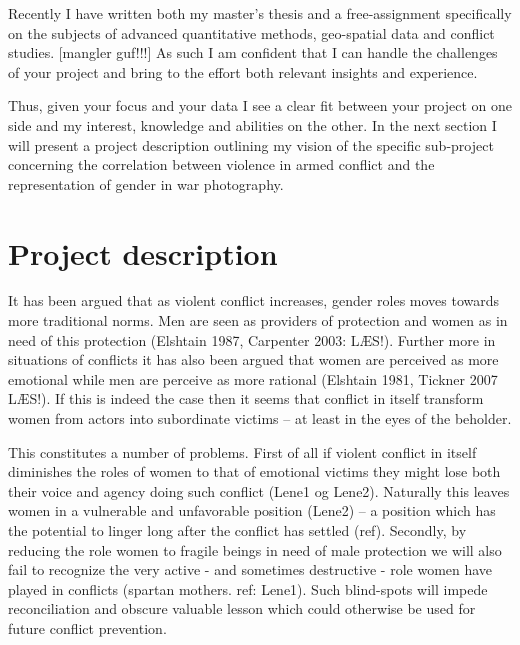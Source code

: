 \documentclass[a4paper]{article}
\begin{document}
Recently I have written both my master's thesis \citep{SPECIALE} and a free-assignment \citep{Maase} specifically on the subjects of advanced quantitative methods, geo-spatial data and conflict studies. [mangler guf!!!] As such I am confident that I can handle the challenges of your project and bring to the effort both relevant insights and experience.\par%

Thus, given your focus and your data I see a clear fit between your project on one side and my interest, knowledge and abilities on the other. In the next section I will present a project description outlining my vision of the specific sub-project concerning the correlation between violence in armed conflict and the representation of gender in war photography.\par

\section{Project description} 



It has been argued that as violent conflict increases, gender roles moves towards more traditional norms. Men are seen as providers of protection and women as in need of this protection (Elshtain 1987, Carpenter 2003: LÆS!). Further more in situations of conflicts it has also been argued that women are perceived as more emotional while men are perceive as more rational (Elshtain 1981, Tickner 2007 LÆS!). If this is indeed the case then it seems that conflict in itself transform women from actors into subordinate victims -- at least in the eyes of the beholder.\par 

This constitutes a number of problems. First of all if violent conflict in itself diminishes the roles of women to that of emotional victims they might lose both their voice and agency doing such conflict (Lene1 og Lene2). Naturally this leaves women in a vulnerable and unfavorable position (Lene2) -- a position which has the potential to linger long after the conflict has settled (ref). Secondly, by reducing the role women to fragile beings in need of male protection we will also fail to recognize the very active - and sometimes destructive - role women have played in conflicts (spartan mothers. ref: Lene1). Such blind-spots will impede reconciliation and obscure valuable lesson which could otherwise be used for future conflict prevention.\par
\end{document}
